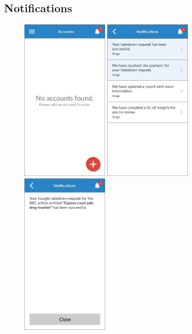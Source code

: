 \clearpage

\subsection{Notifications}

\begin{figure}
  \subfigures
  \centering
  \begin{minipage}{4.6cm}
    \centering
    \includegraphics[width=4.2cm]{inc/ui_not_step1.jpg}
    \caption{}
    \label{fig:ui_not_step1}
  \end{minipage}
  \begin{minipage}{4.6cm}
    \centering
    \includegraphics[width=4.2cm]{inc/ui_not_step2.jpg}
    \caption{}
    \label{fig:ui_not_step2}
  \end{minipage}
  \begin{minipage}{4.6cm}
    \centering
    \includegraphics[width=4.2cm]{inc/ui_not_step3.jpg}

\end{minipage}
\end{figure}
